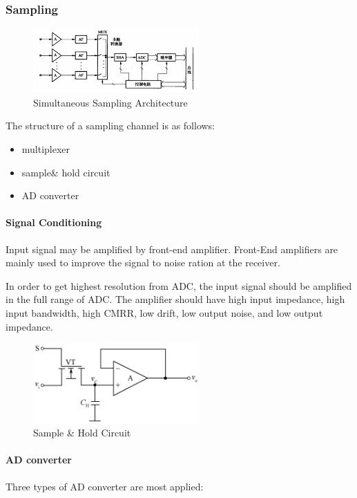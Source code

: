 \subsubsection{Sampling}

\begin{figure}
  \centering
  \includegraphics[width=2.5in]{fig/sample_channel.png}
  \caption{Simultaneous Sampling Architecture}\label{fig_sample_channel}
\end{figure}

The structure of a sampling channel is as follows:

\begin{itemize}
  \item multiplexer
  \item sample\& hold circuit
  \item AD converter
\end{itemize}

\paragraph{Signal Conditioning} Input signal may be amplified by front-end amplifier. Front-End amplifiers are mainly used to improve the signal to noise ration at the receiver.

In order to get highest resolution from ADC, the input signal should be amplified in the full range of ADC. The amplifier should have high input impedance, high input bandwidth, high CMRR, low drift, low output noise, and low output impedance.

\begin{figure}
  \centering
  \includegraphics[width=2.5in]{fig/SHA_circuit.png}
  \caption{Sample \& Hold Circuit}\label{fig_SHA}
\end{figure}

\paragraph{AD converter} Three types of AD converter are most applied:


